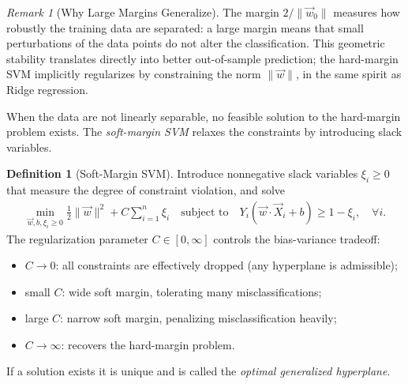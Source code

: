 \documentclass[11pt]{article}
\theoremstyle{definition}
\newtheorem{definition}{Definition}[section]
\theoremstyle{plain}
\theoremstyle{remark}
\newtheorem{remark}{Remark}[section]
\begin{document}
\begin{remark}[Why Large Margins Generalize]
    The margin $2/\|\vec{w}_0\|$ measures how robustly the training data are separated: a large margin means that small perturbations of the data points do not alter the classification. This geometric stability translates directly into better out-of-sample prediction; the hard-margin SVM implicitly regularizes by constraining the norm $\|\vec{w}\|$, in the same spirit as Ridge regression.
\end{remark}

When the data are not linearly separable, no feasible solution to the hard-margin problem exists. The \emph{soft-margin SVM} relaxes the constraints by introducing slack variables.

\begin{definition}[Soft-Margin SVM]
    Introduce nonnegative slack variables $\xi_i \geq 0$ that measure the degree of constraint violation, and solve
    \begin{align}
        \min_{\vec{w},b,\xi_i \geq 0} \frac{1}{2}\|\vec{w}\|^2 + C\sum_{i=1}^n \xi_i \quad \text{subject to} \quad Y_i(\vec{w}\cdot\vec{X}_i + b) \geq 1 - \xi_i, \quad \forall i.
    \end{align}
    The regularization parameter $C \in [0,\infty]$ controls the bias-variance tradeoff:
    \begin{itemize}[noitemsep]
        \item $C \to 0$: all constraints are effectively dropped (any hyperplane is admissible);
        \item small $C$: wide soft margin, tolerating many misclassifications;
        \item large $C$: narrow soft margin, penalizing misclassification heavily;
        \item $C \to \infty$: recovers the hard-margin problem.
    \end{itemize}
    If a solution exists it is unique and is called the \emph{optimal generalized hyperplane}.
\end{definition}
\end{document}
